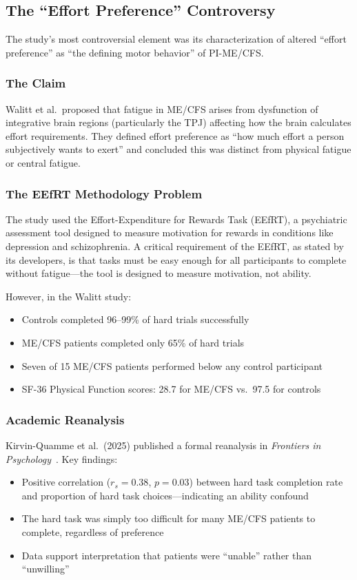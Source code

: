 \subsection{The ``Effort Preference'' Controversy}
\label{sec:effort-preference-controversy}

The study's most controversial element was its characterization of altered ``effort preference'' as ``the defining motor behavior'' of PI-ME/CFS.

\subsubsection{The Claim}
Walitt et al.\ proposed that fatigue in ME/CFS arises from dysfunction of integrative brain regions (particularly the TPJ) affecting how the brain calculates effort requirements. They defined effort preference as ``how much effort a person subjectively wants to exert'' and concluded this was distinct from physical fatigue or central fatigue.

\subsubsection{The EEfRT Methodology Problem}
The study used the Effort-Expenditure for Rewards Task (EEfRT), a psychiatric assessment tool designed to measure motivation for rewards in conditions like depression and schizophrenia. A critical requirement of the EEfRT, as stated by its developers, is that tasks must be easy enough for all participants to complete without fatigue---the tool is designed to measure motivation, not ability.

However, in the Walitt study:
\begin{itemize}
    \item Controls completed 96--99\% of hard trials successfully
    \item ME/CFS patients completed only 65\% of hard trials
    \item Seven of 15 ME/CFS patients performed below any control participant
    \item SF-36 Physical Function scores: 28.7 for ME/CFS vs.\ 97.5 for controls
\end{itemize}

\subsubsection{Academic Reanalysis}
Kirvin-Quamme et al.\ (2025) published a formal reanalysis in \textit{Frontiers in Psychology}~\cite{kirvinquamme2025effort}. Key findings:
\begin{itemize}
    \item Positive correlation ($r_s=0.38$, $p=0.03$) between hard task completion rate and proportion of hard task choices---indicating an ability confound
    \item The hard task was simply too difficult for many ME/CFS patients to complete, regardless of preference
    \item Data support interpretation that patients were ``unable'' rather than ``unwilling''
\end{itemize}

